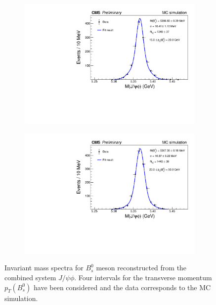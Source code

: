\begin{figure}
\begin{subfigure}[b]{0.475\textwidth}
		\includegraphics[width=\textwidth]{MainContent/Figs/mass/mass_BsFitMC_best1_ptbins_15_20.PDF}
		\caption{}
	\end{subfigure}
	\hfill
	\begin{subfigure}[b]{0.475\textwidth}
		\centering
		\includegraphics[width=\textwidth]{MainContent/Figs/mass/mass_BsFitMC_best1_ptbins_20_50.PDF}
		\caption{}%
	\end{subfigure}
	\caption{Invariant mass spectra for $B^0_s$ meson reconstructed from the combined system $J/\psi \phi$. Four intervals for the transverse momentum $p_T(B^0_s)$ have been considered and the data corresponds to the MC simulation.}
	\label{fig:massMC_ptbins}
\end{figure}

